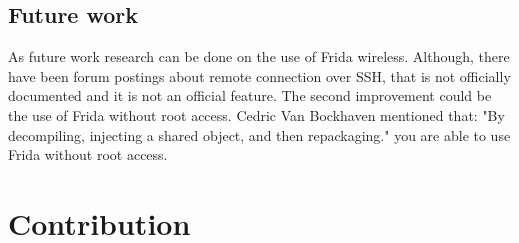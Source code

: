 \documentclass[12pt, a4paper]{report}
\begin{document}
\section{Future work}

As future work research can be done on the use of Frida wireless. Although, there have been forum postings about remote connection over SSH, that is not officially documented and it is not an official feature.
\newline
\newline
The second improvement could be the use of Frida without root access. Cedric Van Bockhaven mentioned that: "By decompiling, injecting a shared object, and then repackaging." you are able to use Frida without root access.

\chapter{Contribution} 



\end{document}
